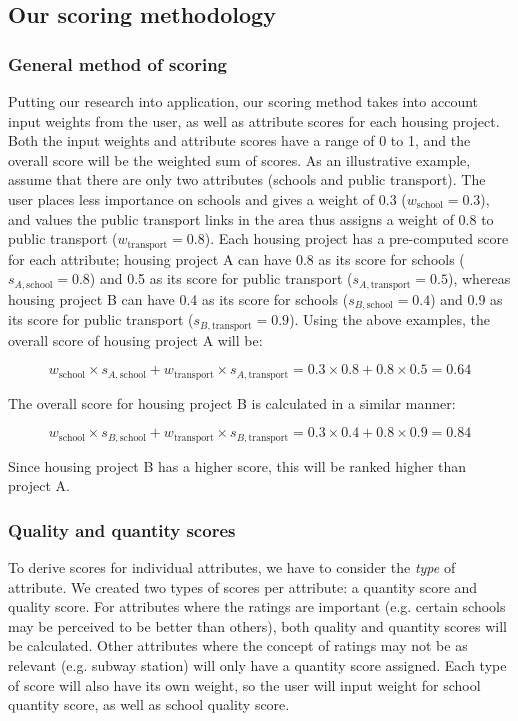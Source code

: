 \documentclass[a4paper, 11pt]{article}
\begin{document}
    \subsection{Our scoring methodology}
    
\subsubsection{General method of scoring}    
    
    Putting our research into application, our scoring method takes into account input weights from the user, as well as attribute scores for each housing project. Both the input weights and attribute scores have a range of 0 to 1, and the overall score will be the weighted sum of scores. As an illustrative example, assume that there are only two attributes (schools and public transport). The user places less importance on schools and gives a weight of  0.3 ($w_{\text{school}}  = 0.3$), and values the public transport links in the area thus assigns a weight of 0.8 to public transport ($w_{\text{transport}}  = 0.8$). Each housing project has a pre-computed score for each attribute; housing project A can have 0.8 as its score for schools ($s_{A,\text{school}} = 0.8$) and 0.5 as its score for public transport ($s_{A,\text{transport}} = 0.5$), whereas housing project B can have 0.4 as its score for schools ($s_{B,\text{school}} = 0.4$) and 0.9 as its score for public transport ($s_{B,\text{transport}} = 0.9$). Using the above examples, the overall score of housing project A will be:
    
\[ w_{\text{school}} \times s_{A,\text{school}} + w_{\text{transport}} \times s_{A,\text{transport}} = 0.3 \times 0.8 + 0.8 \times 0.5 = 0.64 \]

The overall score for housing project B is calculated in a similar manner:

    \[ w_{\text{school}} \times s_{B,\text{school}} + w_{\text{transport}} \times s_{B,\text{transport}} = 0.3 \times 0.4 + 0.8 \times 0.9 = 0.84 \]

Since housing project B has a higher score, this will be ranked higher than project A.

\subsubsection{Quality and quantity scores}

To derive scores for individual attributes, we have to consider the \textit{type} of attribute. We created two types of scores per attribute: a quantity score and quality score.  For attributes where the ratings are important (e.g. certain schools may be perceived to be better than others), both quality and quantity scores will be calculated. Other attributes where the concept of ratings may not be as relevant (e.g. subway station) will only have a quantity score assigned. Each type of score will also have its own weight, so the user will input weight for school quantity score, as well as school quality score. 
\end{document}
